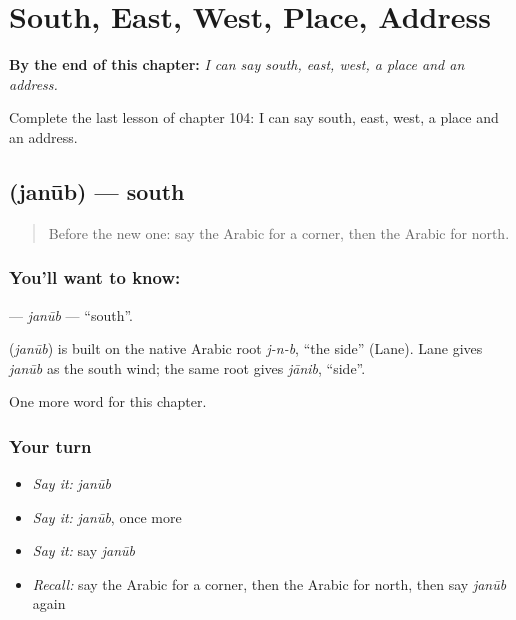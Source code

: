 
\chapter{South, East, West, Place, Address}
\label{ch:ar-south-east-west-place-address}

\begin{chapteropening}
\textbf{By the end of this chapter:} \emph{I can say south, east, west, a place and an address.}

Complete the last lesson of chapter 104: I can say south, east, west, a place and an address.
\end{chapteropening}

\section[\texorpdfstring{\ar{جنوب} (janūb)}{جنوب (janūb)}]{ (janūb) — south}

\label{lesson:AR-C104-janub}



\begin{quote}
Before the new one: say the Arabic for a corner, then the Arabic for north.
\end{quote}

\subsection*{You'll want to know: }
\textbf{} — \emph{janūb} — \textquotedblleft{}south\textquotedblright{}.

\begin{cousinweb}
\textbf{} (\emph{janūb}) is built on the native Arabic root \emph{j-n-b}, \textquotedblleft{}the side\textquotedblright{} (Lane). Lane gives \emph{janūb} as the south wind; the same root gives \emph{jānib}, \textquotedblleft{}side\textquotedblright{}.
\end{cousinweb}

\begin{grammarlens}[title={What you've built}]
One more word for this chapter.
\end{grammarlens}

\subsection*{Your turn}
\begin{itemize}
\raggedright
  \item \emph{Say it:} \emph{janūb}
  \item \emph{Say it:} \emph{janūb}, once more
  \item \emph{Say it:} say \emph{janūb}
  \item \emph{Recall:} say the Arabic for a corner, then the Arabic for north, then say \emph{janūb} again
\end{itemize}

